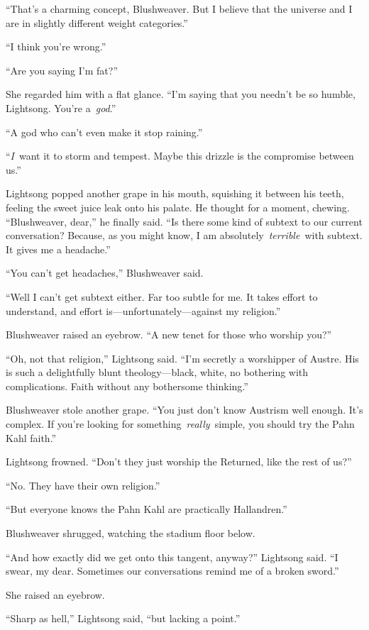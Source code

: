 “That’s a charming concept, Blushweaver. But I believe that the universe and I are in slightly different weight categories.”

“I think you’re wrong.”

“Are you saying I’m fat?”

She regarded him with a flat glance. “I’m saying that you needn’t be so humble, Lightsong. You’re a~\textit{god}.”

“A god who can’t even make it stop raining.”

“\textit{I}~want it to storm and tempest. Maybe this drizzle is the compromise between us.”

Lightsong popped another grape in his mouth, squishing it between his teeth, feeling the sweet juice leak onto his palate. He thought for a moment, chewing. “Blushweaver, dear,” he finally said. “Is there some kind of subtext to our current conversation? Because, as you might know, I am absolutely~\textit{terrible}~with subtext. It gives me a headache.”

“You can’t get headaches,” Blushweaver said.

“Well I can’t get subtext either. Far too subtle for me. It takes effort to understand, and effort is—unfortunately—against my religion.”

Blushweaver raised an eyebrow. “A new tenet for those who worship you?”

“Oh, not that religion,” Lightsong said. “I’m secretly a worshipper of Austre. His is such a delightfully blunt theology—black, white, no bothering with complications. Faith without any bothersome thinking.”

Blushweaver stole another grape. “You just don’t know Austrism well enough. It’s complex. If you’re looking for something~\textit{really}~simple, you should try the Pahn Kahl faith.”

Lightsong frowned. “Don’t they just worship the Returned, like the rest of us?”

“No. They have their own religion.”

“But everyone knows the Pahn Kahl are practically Hallandren.”

Blushweaver shrugged, watching the stadium floor below.

“And how exactly did we get onto this tangent, anyway?” Lightsong said. “I swear, my dear. Sometimes our conversations remind me of a broken sword.”

She raised an eyebrow.

“Sharp as hell,” Lightsong said, “but lacking a point.”

